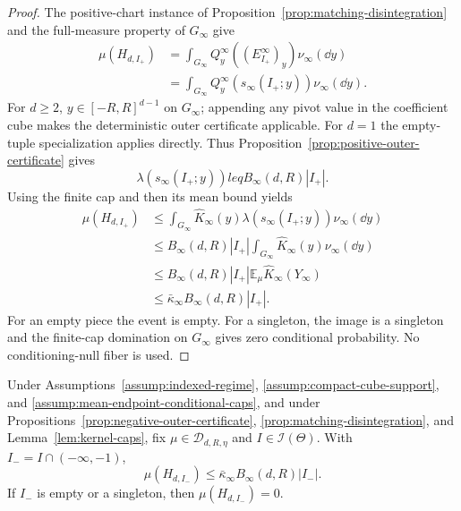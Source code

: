 \begin{proof}
The positive-chart instance of Proposition~\ref{prop:matching-disintegration}
and the full-measure property of $G_\infty$ give
\[
\begin{aligned}
\mu(H_{d,I_+})
&=\int_{G_\infty}Q^\infty_y((E^\infty_{I_+})_y)\nu_\infty(\dd y)\\
&=\int_{G_\infty}Q^\infty_y(s_\infty(I_+;y))\nu_\infty(\dd y).
\end{aligned}
\]
For $d\geq2$, $y\in[-R,R]^{d-1}$ on $G_\infty$; appending any pivot value
in the coefficient cube makes the deterministic outer certificate applicable.
For $d=1$ the empty-tuple specialization applies directly.  Thus
Proposition~\ref{prop:positive-outer-certificate} gives
\[
\lambda(s_\infty(I_+;y))leq B_\infty(d,R)|I_+|.
\]
Using the finite cap and then its mean bound yields
\[
\begin{aligned}
\mu(H_{d,I_+})
&\leq\int_{G_\infty}\widehat K_\infty(y)
       \lambda(s_\infty(I_+;y))\nu_\infty(\dd y)\\
&\leq B_\infty(d,R)|I_+|
       \int_{G_\infty}\widehat K_\infty(y)\nu_\infty(\dd y)\\
&\leq B_\infty(d,R)|I_+|
       \mathbb E_\mu\widehat K_\infty(Y_\infty)\\
&\leq\bar\kappa_\infty B_\infty(d,R)|I_+|.
\end{aligned}
\]
For an empty piece the event is empty.  For a singleton, the image is a
singleton and the finite-cap domination on $G_\infty$ gives zero conditional
probability.  No conditioning-null fiber is used.
\end{proof}

\begin{proposition}
\label{prop:negative-chart-probability}
Under Assumptions~\ref{assump:indexed-regime},
\ref{assump:compact-cube-support}, and
\ref{assump:mean-endpoint-conditional-caps}, and under
Propositions~\ref{prop:negative-outer-certificate},
\ref{prop:matching-disintegration}, and Lemma~\ref{lem:kernel-caps}, fix
$\mu\in\mathcal D_{d,R,\eta}$ and $I\in\mathcal I(\Theta)$.  With
$I_-=I\cap(-\infty,-1)$,
\[
\mu(H_{d,I_-})\leq\bar\kappa_\infty B_\infty(d,R)|I_-|.
\]
If $I_-$ is empty or a singleton, then $\mu(H_{d,I_-})=0$.
\end{proposition}

